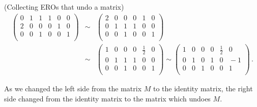 \begin{example} \label{undo_a_matrix}(Collecting EROs that \hypertarget{undo a matrix}{undo a matrix})
\begin{eqnarray*}
\left(\begin{array}{ccc|ccc}
0 & 1 & 1 &1 &0 &0\\ 
2 & 0 & 0 &0&1&0\\
0& 0 & 1   &0  &0 &1\\
\end{array}  \right)
&\!\!\sim\!\!&
\left(\begin{array}{ccc|ccc}
2 & 0 & 0 &0&1&0\\
0 & 1 & 1 &1 &0 &0\\ 
0& 0 & 1   &0  &0 &1\\
\end{array}  \right)
\\[2mm]
&\!\!\sim\!\!&
\left(\begin{array}{ccc|ccc}
1 & 0 & 0 &0&\frac12&0\\
0 & 1 & 1 &1 &0 &0\\ 
0& 0 & 1   &0  &0 &1\\
\end{array}  \right)
\sim
\left(\begin{array}{ccc|ccr}
1 & 0 & 0 &0&\frac12&0\\
0 & 1 & 0 &1 &0 &\!\!\!-1\\ 
0& 0 & 1   &0  &0 &1\\
\end{array}  \right)\, .
\end{eqnarray*}
\end{example}
\noindent
As we changed the left side from the matrix $M$ to the identity matrix, the right side changed from the identity matrix to the matrix which undoes $M$. 
